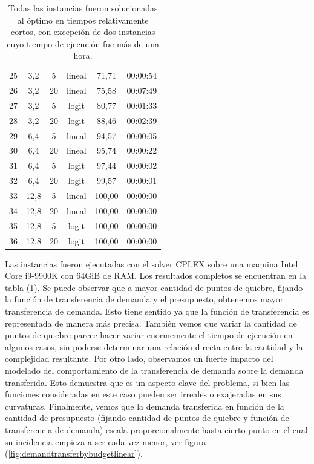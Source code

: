 \documentclass{article}
\begin{document}
\begin{table}
\begin{tabular}{cccccc}
        25 & 3,2 & 5 & lineal & 71,71 & 00:00:54 \\
        26 & 3,2 & 20 & lineal & 75,58 & 00:07:49 \\
        27 & 3,2 & 5 & logit & 80,77 & 00:01:33 \\
        28 & 3,2 & 20 & logit & 88,46 & 00:02:39 \\
        29 & 6,4 & 5 & lineal & 94,57 & 00:00:05 \\
        30 & 6,4 & 20 & lineal & 95,74 & 00:00:22 \\
        31 & 6,4 & 5 & logit & 97,44 & 00:00:02 \\
        32 & 6,4 & 20 & logit & 99,57 & 00:00:01 \\
        33 & 12,8 & 5 & lineal & 100,00 & 00:00:00 \\
        34 & 12,8 & 20 & lineal & 100,00 & 00:00:00 \\
        35 & 12,8 & 5 & logit & 100,00 & 00:00:00 \\
        36 & 12,8 & 20 & logit & 100,00 & 00:00:00 \\
        \bottomrule
    \end{tabular}
      \caption{Todas las instancias fueron solucionadas al óptimo en tiempos relativamente cortos, con excepción de dos instancias cuyo tiempo de ejecución fue más de una hora.} \label{table:sensibilityresults}
  \end{table}

  Las instancias fueron ejecutadas con el solver CPLEX sobre una maquina Intel Core i9-9900K con 64GiB de RAM. Los resultados completos se encuentran en la tabla (\ref{table:sensibilityresults}). Se puede observar que a mayor cantidad de puntos de quiebre, fijando la función de transferencia de demanda y el presupuesto, obtenemos mayor transferencia de demanda. Esto tiene sentido ya que la función de transferencia es representada de manera más precisa. También vemos que variar la cantidad de puntos de quiebre parece hacer variar enormemente el tiempo de ejecución en algunos casos, sin poderse determinar una relación directa entre la cantidad y la complejidad resultante. Por otro lado, observamos un fuerte impacto del modelado del comportamiento de la transferencia de demanda sobre la demanda transferida. Esto demuestra que es un aspecto clave del problema, si bien las funciones consideradas en este caso pueden ser irreales o exajeradas en sus curvaturas. Finalmente, vemos que la demanda transferida en función de la cantidad de presupuesto (fijando cantidad de puntos de quiebre y función de transferencia de demanda) escala proporcionalmente hasta cierto punto en el cual su incidencia empieza a ser cada vez menor, ver figura (\ref{fig:demandtransferbybudgetlinear}).
\end{document}
